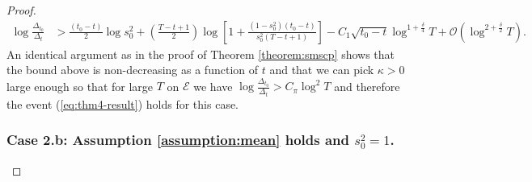 \begin{proof}
\begin{align*}
    \log \frac{\Delta_{t_0}}{\Delta_t} &> \frac{(t_0-t)}{2}\log s_0^2 + \left(\frac{T - t +1}{2}\right)\log\left[1 + \frac{(1 - s_0^2)(t_0 - t)}{s_0^{2}(T-t+1)}\right] - C_1\sqrt{t_0 -t} \log^{1+\frac{\delta}{4}} T + \mathcal{O}\left(\log^{2+\frac{\delta}{2}} T\right).
\end{align*}
An identical argument as in the proof of Theorem \ref{theorem:smscp} shows that the bound above is non-decreasing as a function of $t$ and that we can pick $\kappa > 0$ large enough so that for large $T$ on $\mathcal{E}$ we have $ \log \frac{\Delta_{t_0}}{\Delta_t} > C_\pi\log^{2} T $ and therefore the event (\ref{eq:thm4-result}) holds for this case.

\subsubsection*{Case 2.b: Assumption \ref{assumption:mean} holds and $s_0^2 =1$.}


\end{proof}
